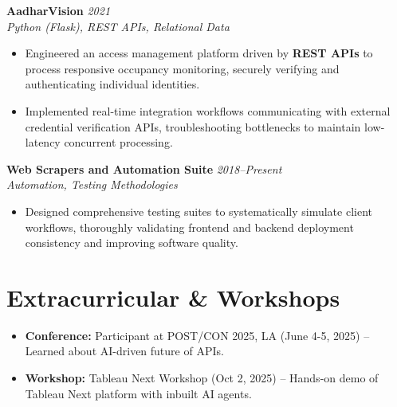 \documentclass[letterpaper,11pt]{article}
\begin{document}
\textbf{AadharVision} \hfill \textit{2021} \\
\textit{Python (Flask), REST APIs, Relational Data}
\begin{itemize} \itemsep -2pt
    \item Engineered an access management platform driven by \textbf{REST APIs} to process responsive occupancy monitoring, securely verifying and authenticating individual identities.
    \item Implemented real-time integration workflows communicating with external credential verification APIs, troubleshooting bottlenecks to maintain low-latency concurrent processing.
\end{itemize}

\textbf{Web Scrapers and Automation Suite} \hfill \textit{2018--Present} \\
\textit{Automation, Testing Methodologies}
\begin{itemize} \itemsep -2pt
    \item Designed comprehensive testing suites to systematically simulate client workflows, thoroughly validating frontend and backend deployment consistency and improving software quality.
\end{itemize}

\section*{Extracurricular \& Workshops}
\begin{itemize} \itemsep -2pt
    \item \textbf{Conference:} Participant at POST/CON 2025, LA (June 4-5, 2025) -- Learned about AI-driven future of APIs.
    \item \textbf{Workshop:} Tableau Next Workshop (Oct 2, 2025) -- Hands-on demo of Tableau Next platform with inbuilt AI agents.
\end{itemize}
\end{document}
